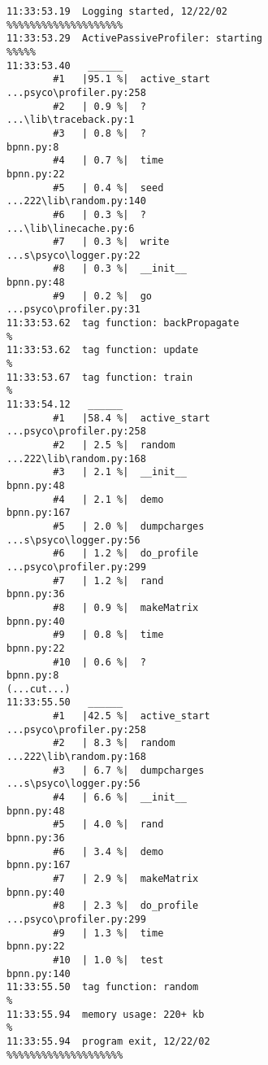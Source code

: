 \documentclass{manual}
\begin{document}
\begin{verbatim}
11:33:53.19  Logging started, 12/22/02                  %%%%%%%%%%%%%%%%%%%%
11:33:53.29  ActivePassiveProfiler: starting                           %%%%%
11:33:53.40   ______
        #1   |95.1 %|  active_start              ...psyco\profiler.py:258
        #2   | 0.9 %|  ?                         ...\lib\traceback.py:1
        #3   | 0.8 %|  ?                                      bpnn.py:8
        #4   | 0.7 %|  time                                   bpnn.py:22
        #5   | 0.4 %|  seed                      ...222\lib\random.py:140
        #6   | 0.3 %|  ?                         ...\lib\linecache.py:6
        #7   | 0.3 %|  write                     ...s\psyco\logger.py:22
        #8   | 0.3 %|  __init__                               bpnn.py:48
        #9   | 0.2 %|  go                        ...psyco\profiler.py:31
11:33:53.62  tag function: backPropagate                                   %
11:33:53.62  tag function: update                                          %
11:33:53.67  tag function: train                                           %
11:33:54.12   ______
        #1   |58.4 %|  active_start              ...psyco\profiler.py:258
        #2   | 2.5 %|  random                    ...222\lib\random.py:168
        #3   | 2.1 %|  __init__                               bpnn.py:48
        #4   | 2.1 %|  demo                                   bpnn.py:167
        #5   | 2.0 %|  dumpcharges               ...s\psyco\logger.py:56
        #6   | 1.2 %|  do_profile                ...psyco\profiler.py:299
        #7   | 1.2 %|  rand                                   bpnn.py:36
        #8   | 0.9 %|  makeMatrix                             bpnn.py:40
        #9   | 0.8 %|  time                                   bpnn.py:22
        #10  | 0.6 %|  ?                                      bpnn.py:8
(...cut...)
11:33:55.50   ______
        #1   |42.5 %|  active_start              ...psyco\profiler.py:258
        #2   | 8.3 %|  random                    ...222\lib\random.py:168
        #3   | 6.7 %|  dumpcharges               ...s\psyco\logger.py:56
        #4   | 6.6 %|  __init__                               bpnn.py:48
        #5   | 4.0 %|  rand                                   bpnn.py:36
        #6   | 3.4 %|  demo                                   bpnn.py:167
        #7   | 2.9 %|  makeMatrix                             bpnn.py:40
        #8   | 2.3 %|  do_profile                ...psyco\profiler.py:299
        #9   | 1.3 %|  time                                   bpnn.py:22
        #10  | 1.0 %|  test                                   bpnn.py:140
11:33:55.50  tag function: random                                          %
11:33:55.94  memory usage: 220+ kb                                         %
11:33:55.94  program exit, 12/22/02                     %%%%%%%%%%%%%%%%%%%%
\end{verbatim}
\end{document}
